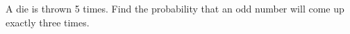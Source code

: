 \documentclass[journal,12pt,twocolumn]{IEEEtran}
\theoremstyle{remark}
\begin{document}



\maketitle

\newpage


\bigskip

\renewcommand{\thefigure}{\theenumi}
\renewcommand{\thetable}{\theenumi}

A die is thrown 5 times. Find the probability that an odd number will come up exactly three times.
\end{document}
